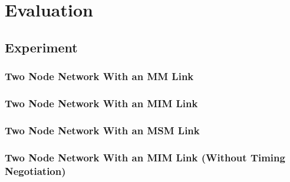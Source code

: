 \chapter{Evaluation}
\label{evaluation}

\section{Experiment}
\subsection{Two Node Network With an MM Link}
\subsection{Two Node Network With an MIM Link}
\subsection{Two Node Network With an MSM Link}
\subsection{Two Node Network With an MIM Link (Without Timing Negotiation)}



